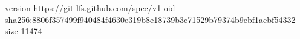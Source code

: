 version https://git-lfs.github.com/spec/v1
oid sha256:8806f357499f940484f4630e319b8e18739b3c71529b79374b9ebf1aebf54332
size 11474
